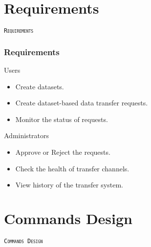 \documentclass[19pt]{beamer}
\begin{document}
\section{Requirements}

\begin{frame}
    \begin{center}
        \LARGE \tt{{\textsc{Requirements}}}
    \end{center}
\end{frame}

\begin{frame}
    \frametitle{Requirements}
    \begin{block}{Users}
        \begin{itemize}
            \item Create datasets.
            \item Create dataset-based data transfer requests.
            \item Monitor the status of requests.
        \end{itemize}
    \end{block}
    \begin{block}{Administrators}
        \begin{itemize}
            \item Approve or Reject the requests.
            \item Check the health of transfer channels.
            \item View history of the transfer system.
        \end{itemize}
    \end{block}
\end{frame}

\section{Commands Design}

\begin{frame}
    \begin{center}
        \LARGE \tt{{\textsc{Commands Design}}}
    \end{center}
\end{frame}
\end{document}
